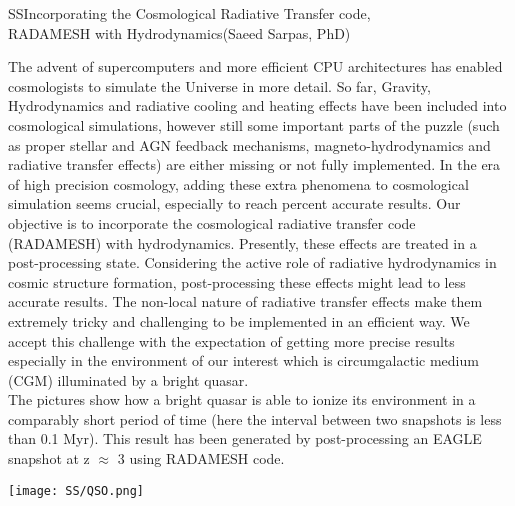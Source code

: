 \begin{section}{SS}{Incorporating the Cosmological Radiative Transfer code, \\
    \hspace*{4cm} RADAMESH with Hydrodynamics}{(Saeed Sarpas, PhD)}
  \begin{minipage}{\linewidth}
    \strut {\small The advent of supercomputers and more efficient CPU
      architectures has enabled cosmologists to simulate the Universe in more
      detail. So far, Gravity, Hydrodynamics and radiative cooling and heating
      effects have been included into cosmological simulations, however
      still some important parts of the puzzle (such as
      proper stellar and AGN feedback mechanisms, magneto-hydrodynamics and
      radiative transfer effects) are either missing or not fully implemented.
      In the era of high precision cosmology, adding these extra phenomena to
      cosmological simulation seems crucial,
      especially to reach percent accurate results. Our objective is to
      incorporate the cosmological radiative transfer code (RADAMESH) with
      hydrodynamics.
      Presently, these effects are treated in a post-processing state.
      Considering the active role of radiative hydrodynamics in cosmic structure
      formation, post-processing these effects might lead to less accurate
      results. The
      non-local nature of radiative transfer effects make them extremely tricky and
      challenging to be implemented in an efficient way. We accept this
      challenge with the expectation of getting more precise results especially
      in the environment of our interest which is circumgalactic medium
      (CGM) illuminated by a bright quasar.\\
      The pictures show how a bright quasar is able to ionize its
      environment in a comparably short period of time (here the interval
      between two snapshots is less than 0.1 Myr). This
      result has been generated by post-processing an EAGLE snapshot at z
      $\approx$ 3 using RADAMESH code.
    }
  \end{minipage}

  \vspace{0.5cm}

  \begin{minipage}{\linewidth}
    \begin{center}
      \texttt{[image: SS/QSO.png]}
    \end{center}
  \end{minipage}
\end{section}